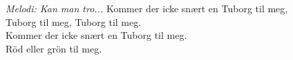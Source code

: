 {\footnotesize\textit{Melodi: Kan man tro...}}
\vspace{10pt}
Kommer der icke snært en Tuborg til meg,\\
Tuborg til meg, Tuborg til meg.\\
Kommer der icke snært en Tuborg til meg.\\
Röd eller grön til meg.

